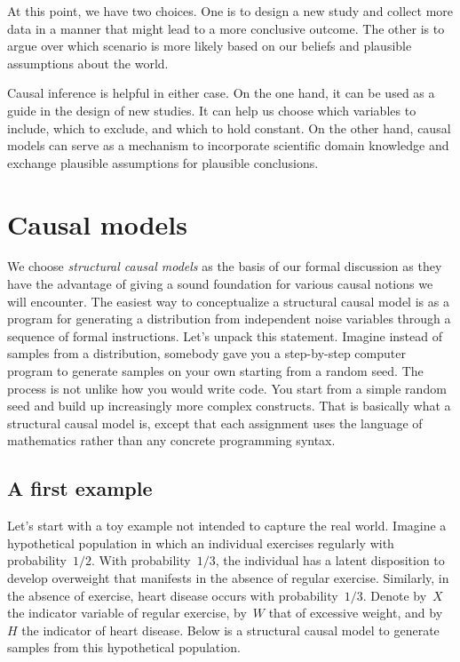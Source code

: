 \documentclass{tufte-book}
\begin{document}
At this point, we have two choices. One is to design a new study and
collect more data in a manner that might lead to a more conclusive
outcome. The other is to argue over which scenario is more likely based
on our beliefs and plausible assumptions about the world.

Causal inference is helpful in either case. On the one hand, it can be
used as a guide in the design of new studies. It can help us choose
which variables to include, which to exclude, and which to hold
constant. On the other hand, causal models can serve as a mechanism to
incorporate scientific domain knowledge and exchange plausible
assumptions for plausible conclusions.

\hypertarget{causal-models}{%
\section{Causal models}\label{causal-models}}

We choose \emph{structural causal models} as the
basis of our formal discussion as they have the advantage of giving a
sound foundation for various causal notions we will encounter. The
easiest way to conceptualize a structural causal model is as a program
for generating a distribution from independent noise variables through a
sequence of formal instructions. Let's unpack this statement. Imagine
instead of samples from a distribution, somebody gave you a step-by-step
computer program to generate samples on your own starting from a random
seed. The process is not unlike how you would write code. You start from
a simple random seed and build up increasingly more complex constructs.
That is basically what a structural causal model is, except that each
assignment uses the language of mathematics rather than any concrete
programming syntax.

\hypertarget{a-first-example}{%
\subsection{A first example}\label{a-first-example}}

Let's start with a toy example not intended to capture the real world.
Imagine a hypothetical population in which an individual exercises
regularly with probability~\(1/2\). With probability~\(1/3\), the
individual has a latent disposition to develop overweight that manifests
in the absence of regular exercise. Similarly, in the absence of
exercise, heart disease occurs with probability~\(1/3\). Denote by~\(X\)
the indicator variable of regular exercise, by~\(W\) that of excessive
weight, and by \(H\) the indicator of heart disease. Below is a
structural causal model to generate samples from this hypothetical
population.
\end{document}
